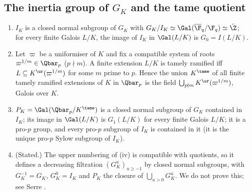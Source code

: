 \subsection{The inertia group of \texorpdfstring{$G_K$}{GK} and the tame quotient}

\begin{theorem}\label{thm:local:inertia-structure}
\begin{enumerate}[label=(\roman*)]
\item $I_K$ is a closed normal subgroup of $G_K$ with $G_K/I_K\simeq\Gal(\overline\F_q/\F_q)\simeq\hat\Z$; for every finite Galois $L/K$, the image of $I_K$ in $\Gal(L/K)$
is $G_0=I(L/K)$.
\item Let $\varpi$ be a uniformiser of $K$ and fix a compatible system of roots $\varpi^{1/m}\in\Qbar_p$ ($p\nmid m$). A finite extension $L/K$ is tamely
ramified iff $L\subseteq K^{\ur}(\varpi^{1/m})$ for some $m$ prime to $p$. Hence the union $K^{\tame}$ of all finite tamely ramified extensions of $K$ in $\Qbar_p$
is the field $\bigcup_{p\nmid m}K^{\ur}(\varpi^{1/m})$, Galois over $K$.
\item $P_K=\Gal(\Qbar_p/K^{\tame})$ is a closed normal subgroup of $G_K$ contained in $I_K$; its image in $\Gal(L/K)$ is $G_1(L/K)$ for every finite Galois
$L/K$; it is a pro-$p$ group, and every pro-$p$ subgroup of $I_K$ is contained in it (it is the unique pro-$p$ Sylow subgroup of $I_K$).
\item (Stated.) The upper numbering of (iv) is compatible with quotients, so it defines a decreasing filtration
$(G_K^u)_{u\ge-1}$ by closed normal subgroups, with $G_K^{-1}=G_K$, $G_K^0=I_K$ and $P_K$ the closure of $\bigcup_{u>0}G_K^u$. We do not prove this;
see Serre \cite[Chapter IV, Section 3]{SerreLocalFields}.
\end{enumerate}
\end{theorem}

